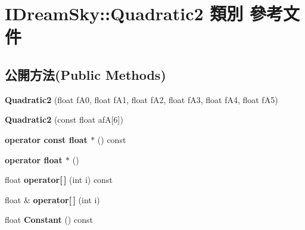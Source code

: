 \hypertarget{class_i_dream_sky_1_1_quadratic2}{}\section{I\+Dream\+Sky\+:\+:Quadratic2 類別 參考文件}
\label{class_i_dream_sky_1_1_quadratic2}
\subsection*{公開方法(Public Methods)}
\begin{DoxyCompactItemize}
\item 
{\bfseries Quadratic2} (float f\+A0, float f\+A1, float f\+A2, float f\+A3, float f\+A4, float f\+A5)\hypertarget{class_i_dream_sky_1_1_quadratic2_adc0be68a2f19c13c18e8c2740fc4b858}{}\label{class_i_dream_sky_1_1_quadratic2_adc0be68a2f19c13c18e8c2740fc4b858}

\item 
{\bfseries Quadratic2} (const float afA\mbox{[}6\mbox{]})\hypertarget{class_i_dream_sky_1_1_quadratic2_ac48e3d164d541783080b5ce484fd42b4}{}\label{class_i_dream_sky_1_1_quadratic2_ac48e3d164d541783080b5ce484fd42b4}

\item 
{\bfseries operator const float $\ast$} () const \hypertarget{class_i_dream_sky_1_1_quadratic2_a4b7e50239b92393fcb633bc687f69e10}{}\label{class_i_dream_sky_1_1_quadratic2_a4b7e50239b92393fcb633bc687f69e10}

\item 
{\bfseries operator float $\ast$} ()\hypertarget{class_i_dream_sky_1_1_quadratic2_ac1ada833815ba2c9dfca0ced94dfc14a}{}\label{class_i_dream_sky_1_1_quadratic2_ac1ada833815ba2c9dfca0ced94dfc14a}

\item 
float {\bfseries operator\mbox{[}$\,$\mbox{]}} (int i) const \hypertarget{class_i_dream_sky_1_1_quadratic2_a5f93823ba2667a424e765bc236010a95}{}\label{class_i_dream_sky_1_1_quadratic2_a5f93823ba2667a424e765bc236010a95}

\item 
float \& {\bfseries operator\mbox{[}$\,$\mbox{]}} (int i)\hypertarget{class_i_dream_sky_1_1_quadratic2_ad5b0c91c989ba917bf33de96eddf1877}{}\label{class_i_dream_sky_1_1_quadratic2_ad5b0c91c989ba917bf33de96eddf1877}

\item 
float {\bfseries Constant} () const \hypertarget{class_i_dream_sky_1_1_quadratic2_a46e9294ad7b6608c256420f873f8b762}{}\label{class_i_dream_sky_1_1_quadratic2_a46e9294ad7b6608c256420f873f8b762}


\end{DoxyCompactItemize}

